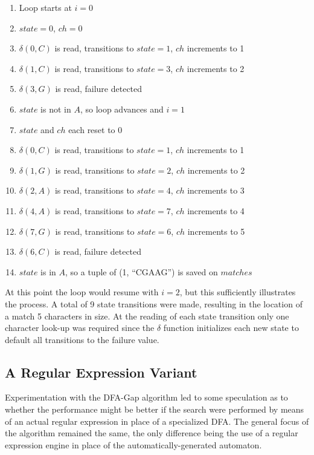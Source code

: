 \begin{enumerate}
\item Loop starts at $i=0$
\item $state=0$, $ch=0$
\item $\delta(0,C)$ is read, transitions to $state=1$, $ch$ increments to 1
\item $\delta(1,C)$ is read, transitions to $state=3$, $ch$ increments to 2
\item $\delta(3,G)$ is read, failure detected
\item $state$ is not in $A$, so loop advances and $i=1$
\item $state$ and $ch$ each reset to 0
\item $\delta(0,C)$ is read, transitions to $state=1$, $ch$ increments to 1
\item $\delta(1,G)$ is read, transitions to $state=2$, $ch$ increments to 2
\item $\delta(2,A)$ is read, transitions to $state=4$, $ch$ increments to 3
\item $\delta(4,A)$ is read, transitions to $state=7$, $ch$ increments to 4
\item $\delta(7,G)$ is read, transitions to $state=6$, $ch$ increments to 5
\item $\delta(6,C)$ is read, failure detected
\item $state$ is in $A$, so a tuple of (1, ``CGAAG'') is saved on $matches$
\end{enumerate}

At this point the loop would resume with $i=2$, but this sufficiently illustrates the process. A total of 9 state transitions were made, resulting in the location of a match 5 characters in size. At the reading of each state transition only one character look-up was required since the $\delta$ function initializes each new state to default all transitions to the failure value.

\subsection{A Regular Expression Variant}
\label{subsec:regexp_variant}

Experimentation with the DFA-Gap algorithm led to some speculation as to whether the performance might be better if the search were performed by means of an actual regular expression in place of a specialized DFA. The general focus of the algorithm remained the same, the only difference being the use of a regular expression engine in place of the automatically-generated automaton.

